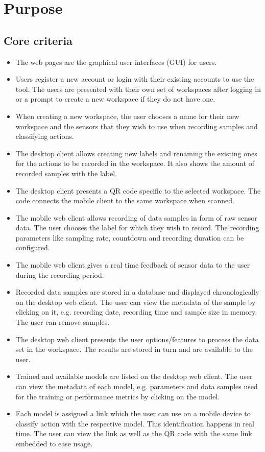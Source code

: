 \section{Purpose}

\subsection{Core criteria}
\begin{itemize}
    \item The web pages are the graphical user interfaces (GUI) for users.
    \item Users register a new account or login with their existing accounts to use the tool. The users are presented with their own set of workspaces after logging in or a prompt to create a new workspace if they do not have one.
    \item When creating a new workspace, the user chooses a name for their new workspace and the sensors that they wish to use when recording samples and classifying actions. %
    \item The desktop client allows creating new labels and renaming the existing ones for the actions to be recorded in the workspace. It also shows the amount of recorded samples with the label. 
    \item The desktop client presents a QR code specific to the selected workspace. The code connects the mobile client to the same \gls{workspace} when scanned.
    \item The mobile web client allows recording of data samples in form of raw sensor data. The user chooses the label for which they wish to record. The recording parameters like sampling rate, countdown and recording duration can be configured.
    \item The mobile web client gives a real time feedback of sensor data to the user during the recording period.
    \item Recorded data samples are stored in a database and displayed chronologically on the desktop web client. The user can view the metadata of the sample by clicking on it, e.g. recording date, recording time and sample size in memory. The user can remove samples.
    \item The desktop web client presents the user options/features to process the data set in the workspace. The results are stored in turn and are available to the user. %
    \item Trained and available models are listed on the desktop web client. The user can view the metadata of each model, e.g. parameters and data samples used for the training or performance metrics by clicking on the model.
    \item Each model is assigned a link which the user can use on a mobile device to classify action with the respective model. This identification happens in real time. The user can view the link as well as the QR code with the same link embedded to ease usage.
\end{itemize}

